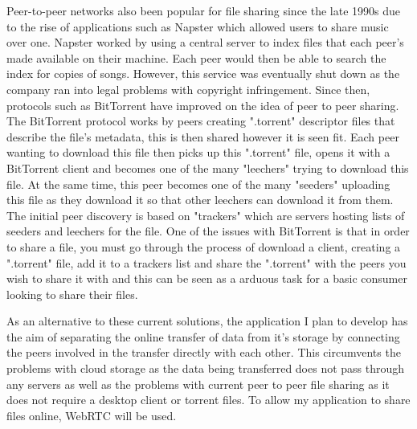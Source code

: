 \documentclass[]{report}
\begin{document}
			Peer-to-peer networks also been popular for file sharing since the late 1990s due to the rise of applications such as Napster which allowed users to share music over one. Napster worked by using a central server to index files that each peer's made available on their machine. Each peer would then be able to search the index for copies of songs. However, this service was eventually shut down as the company ran into legal problems with copyright infringement. Since then, protocols such as BitTorrent have improved on the idea of peer to peer sharing. The BitTorrent protocol works by peers creating ".torrent" descriptor files that describe the file's metadata, this is then shared however it is seen fit. Each peer wanting to download this file then picks up this ".torrent" file, opens it with a BitTorrent client and becomes one of the many "leechers" trying to download this file. At the same time, this peer becomes one of the many "seeders" uploading this file as they download it so that other leechers can download it from them. The initial peer discovery is based on "trackers" which are servers hosting lists of seeders and leechers for the file. One of the issues with BitTorrent is that in order to share a file, you must go through the process of download a client, creating a ".torrent" file, add it to a trackers list and share the ".torrent" with the peers you wish to share it with and this can be seen as a arduous task for a basic consumer looking to share their files.

			As an alternative to these current solutions, the application I plan to develop has the aim of separating the online transfer of data from it's storage by connecting the peers involved in the transfer directly with each other. This circumvents the problems with cloud storage as the data being transferred does not pass through any servers as well as the problems with current peer to peer file sharing as it does not require a desktop client or torrent files. To allow my application to share files online, WebRTC will be used.
			
\end{document}
